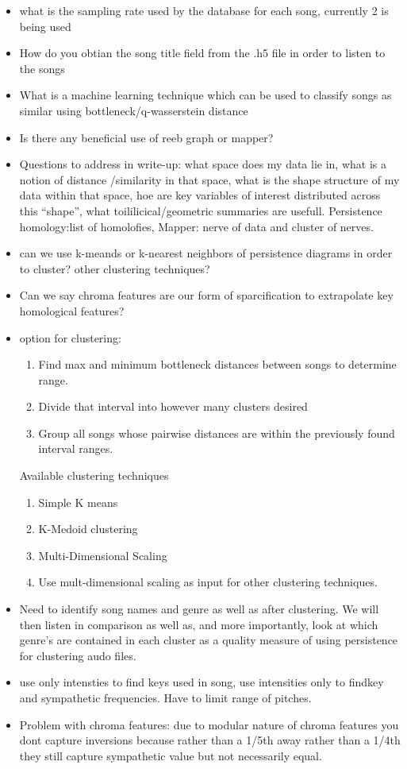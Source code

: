\documentclass[11pt, a4paper]{article}
\begin{document}
  \begin{itemize}
  \item what is the sampling rate used by the database for each song, currently 2 is being used
  \item How do you obtian the song title field from the .h5 file in order to listen to the songs
  \item What is a machine learning technique which can be used to classify songs as similar using bottleneck/q-wasserstein distance
  \item Is there any beneficial use of reeb graph or mapper?
  \item Questions to address in write-up: what space does my data lie in, what is a notion of distance /similarity in that space, what is the shape structure of my data within that space, hoe are key variables of interest distributed across this ``shape'', what toililicical/geometric summaries are usefull. Persistence homology:list of homolofies, Mapper: nerve of data and cluster of nerves.
  \item can we use k-meands or k-nearest neighbors of persistence diagrams in order to cluster? other clustering techniques?
  \item Can we say chroma features are our form of sparcification to extrapolate key homological features?
  \item option for clustering:
    \begin{enumerate}
    \item Find max and minimum bottleneck distances between songs to determine range.
    \item Divide that interval into however many clusters desired
    \item Group all songs whose pairwise distances are within the previously found interval ranges.
    \end{enumerate}
    Available clustering techniques
    \begin{enumerate}
    \item Simple K means
    \item K-Medoid clustering
    \item Multi-Dimensional Scaling
    \item Use mult-dimensional scaling as input for other clustering techniques. 
    \end{enumerate}
  \item Need to identify song names and genre as well as after clustering. We will then listen in comparison as well as, and more importantly, look at which genre's are contained in each cluster as a quality measure of using persistence for clustering audo files.
  \item use only intensties to find keys used in song, use intensities only to findkey and sympathetic frequencies. Have to limit range of pitches.
    \item Problem with chroma features: due to modular nature of chroma features you dont capture inversions because rather than a 1/5th away rather than a 1/4th they still capture sympathetic value but not necessarily equal. 
  \end{itemize}
  
\end{document}
